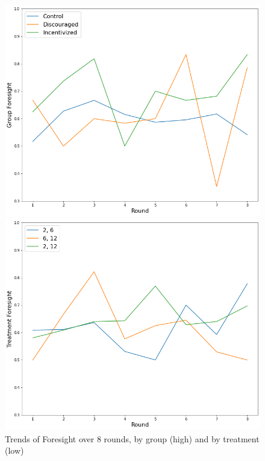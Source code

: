 \documentclass[12pt]{article}
\begin{document}
	
	\begin{figure}[!htb]
		\caption{Trends of Foresight over 8 rounds, by group (high) and by treatment (low)}\label{dynamics}
		\begin{minipage}{0.6\textwidth}
			\centering
			\includegraphics[width=.99\linewidth]{rounds_person.png}
		\end{minipage}
	\begin{minipage}{0.6\textwidth}
		\centering
		\includegraphics[width=.99\linewidth]{rounds_num.png}
	\end{minipage}
	\end{figure}
 	 
\end{document}
